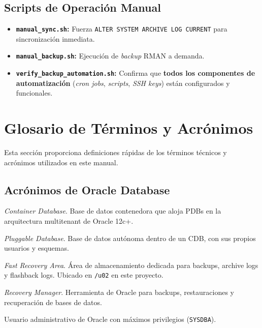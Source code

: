 \documentclass[11pt, a4paper]{report}
\begin{document}
\section{Scripts de Operación Manual}

\begin{itemize}
    \item \textbf{\texttt{manual\_sync.sh}:} Fuerza \texttt{ALTER SYSTEM ARCHIVE LOG CURRENT} para sincronización inmediata.
\item \textbf{\texttt{manual\_backup.sh}:} Ejecución de \textit{backup} RMAN a demanda.
    \item \textbf{\texttt{verify\_backup\_automation.sh}:} Confirma que \textbf{todos los componentes de automatización} (\textit{cron jobs}, \textit{scripts}, \textit{SSH keys}) están configurados y funcionales.
\end{itemize}

\newpage


\chapter{Glosario de Términos y Acrónimos}

Esta sección proporciona definiciones rápidas de los términos técnicos y acrónimos utilizados en este manual.

\section{Acrónimos de Oracle Database}

\begin{description}[style=nextline, leftmargin=3cm, font=\normalfont\bfseries]
    \item[CDB] \textit{Container Database}. Base de datos contenedora que aloja PDBs en la arquitectura multitenant de Oracle 12c+.

    \item[PDB] \textit{Pluggable Database}. Base de datos autónoma dentro de un CDB, con sus propios usuarios y esquemas.

    \item[FRA] \textit{Fast Recovery Area}. Área de almacenamiento dedicada para backups, archive logs y flashback logs. Ubicado en \texttt{/u02} en este proyecto.

    \item[RMAN] \textit{Recovery Manager}. Herramienta de Oracle para backups, restauraciones y recuperación de bases de datos.

    \item[SYS] Usuario administrativo de Oracle con máximos privilegios (\texttt{SYSDBA}).
\end{description}
\end{document}
